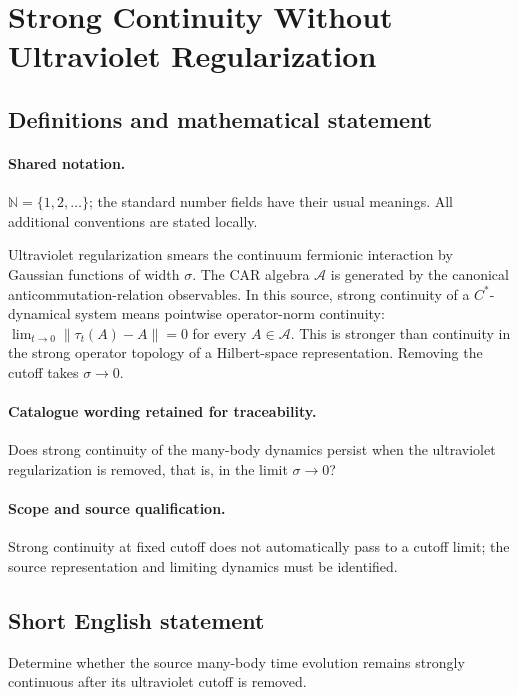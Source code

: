 \documentclass[11pt]{article}
\begin{document}
\section{Strong Continuity Without Ultraviolet Regularization}\label{statement}

\subsection{Definitions and mathematical statement}

\paragraph{Shared notation.}$\mathbb N=\{1,2,\ldots\}$; the standard number fields have their usual meanings. All additional conventions are stated locally.


Ultraviolet regularization smears the continuum fermionic interaction by Gaussian functions of width $\sigma$. The CAR algebra $\mathcal A$ is generated by the canonical anticommutation-relation observables. In this source, strong continuity of a $C^*$-dynamical system means pointwise operator-norm continuity: $\lim_{t\to0}\|\tau_t(A)-A\|=0$ for every $A\in\mathcal A$. This is stronger than continuity in the strong operator topology of a Hilbert-space representation. Removing the cutoff takes $\sigma\to0$.

\paragraph{Catalogue wording retained for traceability.}
Does strong continuity of the many-body dynamics persist when the ultraviolet regularization is removed, that is, in the limit $\sigma\to 0$?

\paragraph{Scope and source qualification.}Strong continuity at fixed cutoff does not automatically pass to a cutoff limit; the source representation and limiting dynamics must be identified.
\subsection{Short English statement}
Determine whether the source many-body time evolution remains strongly continuous after its ultraviolet cutoff is removed.
\end{document}
